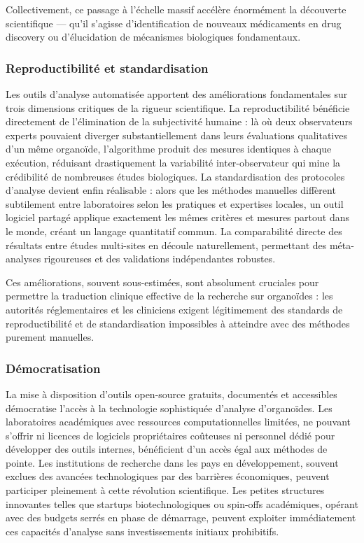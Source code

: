 Collectivement, ce passage à l'échelle massif accélère énormément la découverte scientifique — qu'il s'agisse d'identification de nouveaux médicaments en drug discovery ou d'élucidation de mécanismes biologiques fondamentaux.

\subsubsection{Reproductibilité et standardisation}

Les outils d'analyse automatisée apportent des améliorations fondamentales sur trois dimensions critiques de la rigueur scientifique. La reproductibilité bénéficie directement de l'élimination de la subjectivité humaine : là où deux observateurs experts pouvaient diverger substantiellement dans leurs évaluations qualitatives d'un même organoïde, l'algorithme produit des mesures identiques à chaque exécution, réduisant drastiquement la variabilité inter-observateur qui mine la crédibilité de nombreuses études biologiques. La standardisation des protocoles d'analyse devient enfin réalisable : alors que les méthodes manuelles diffèrent subtilement entre laboratoires selon les pratiques et expertises locales, un outil logiciel partagé applique exactement les mêmes critères et mesures partout dans le monde, créant un langage quantitatif commun. La comparabilité directe des résultats entre études multi-sites en découle naturellement, permettant des méta-analyses rigoureuses et des validations indépendantes robustes.

Ces améliorations, souvent sous-estimées, sont absolument cruciales pour permettre la traduction clinique effective de la recherche sur organoïdes : les autorités réglementaires et les cliniciens exigent légitimement des standards de reproductibilité et de standardisation impossibles à atteindre avec des méthodes purement manuelles.

\subsubsection{Démocratisation}

La mise à disposition d'outils open-source gratuits, documentés et accessibles démocratise l'accès à la technologie sophistiquée d'analyse d'organoïdes. Les laboratoires académiques avec ressources computationnelles limitées, ne pouvant s'offrir ni licences de logiciels propriétaires coûteuses ni personnel dédié pour développer des outils internes, bénéficient d'un accès égal aux méthodes de pointe. Les institutions de recherche dans les pays en développement, souvent exclues des avancées technologiques par des barrières économiques, peuvent participer pleinement à cette révolution scientifique. Les petites structures innovantes telles que startups biotechnologiques ou spin-offs académiques, opérant avec des budgets serrés en phase de démarrage, peuvent exploiter immédiatement ces capacités d'analyse sans investissements initiaux prohibitifs.

